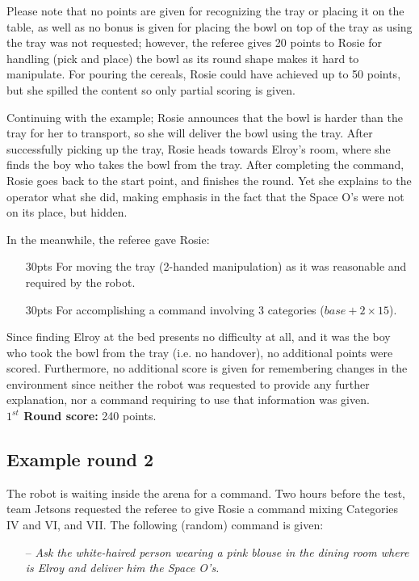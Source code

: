 Please note that no points are given for recognizing the tray or placing it on the table, as well as no bonus is given for placing the bowl on top of the tray as using the tray was not requested; however, the referee gives 20 points to Rosie for handling (pick and place) the bowl as its round shape makes it hard to manipulate. For pouring the cereals, Rosie could have achieved up to 50 points, but she spilled the content so only partial scoring is given. 

Continuing with the example; Rosie announces that the bowl is harder than the tray for her to transport, so she will deliver the bowl using the tray. After successfully picking up the tray, Rosie heads towards Elroy's room, where she finds the boy who takes the bowl from the tray. After completing the command, Rosie goes back to the start point, and finishes the round. Yet she explains to the operator what she did, making emphasis in the fact that the Space O's were not on its place, but hidden.

In the meanwhile, the referee gave Rosie:
\begin{itemize}
	\item[30pts] For moving the tray (2-handed manipulation) as it was reasonable and required by the robot.
	\item[30pts] For accomplishing a command involving 3 categories ($base + 2\times15$).
\end{itemize}

Since finding Elroy at the bed presents no difficulty at all, and it was the boy who took the bowl from the tray (i.e. no handover), no additional points were scored. Furthermore, no additional score is given for remembering changes in the environment since neither the robot was requested to provide any further explanation, nor a command requiring to use that information was given. \\

\textbf{$1^{st}$ Round score:} 240 points.

\subsection{Example round 2}
The robot is waiting inside the arena for a command. Two hours before the test, team Jetsons requested the referee to give Rosie a command mixing Categories IV and VI, and VII. The following (random) command is given:

\begin{itemize}
	\item[--] \textit{Ask the white-haired person wearing a pink blouse in the dining room where is Elroy and deliver him the Space O's.}
\end{itemize}

